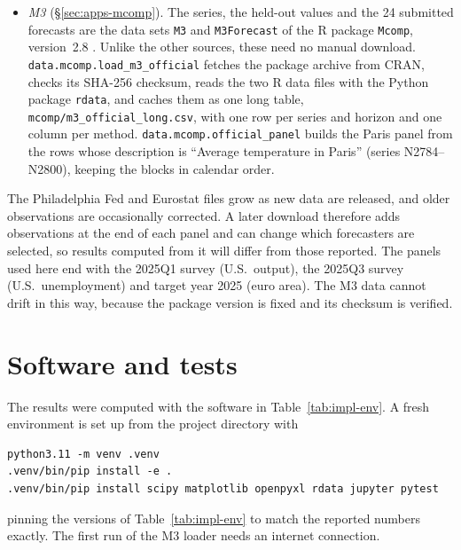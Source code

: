 \begin{appendix}
\begin{itemize}[leftmargin=*]
    \texttt{gjp/ifps.csv} and the individual forecasts of tournament years~1 and~2,
    \texttt{gjp/survey\_fcasts.yr1.csv} and \texttt{gjp/survey\_fcasts.yr2.csv}, come
    from the Harvard Dataverse release \citep{gjpdata2016}, licensed CC0.
    \texttt{data.gjp.brier\_panel} keeps closed questions with a resolved outcome,
    drops withdrawn forecasts and orders the questions by close date.
  \item \emph{M3} (\S\ref{sec:apps-mcomp}). The series, the held-out values and the
    24 submitted forecasts are the data sets \texttt{M3} and \texttt{M3Forecast} of
    the R package \texttt{Mcomp}, version~2.8 \citep{hyndman2018mcomp}. Unlike the
    other sources, these need no manual download.
    \texttt{data.mcomp.load\_m3\_official} fetches the package archive from CRAN,
    checks its SHA-256 checksum, reads the two R data files with the Python package
    \texttt{rdata}, and caches them as one long table,
    \texttt{mcomp/m3\_official\_long.csv}, with one row per series and horizon and
    one column per method. \texttt{data.mcomp.official\_panel} builds the Paris panel
    from the rows whose description is ``Average temperature in Paris'' (series
    N2784--N2800), keeping the blocks in calendar order.
\end{itemize}
The Philadelphia Fed and Eurostat files grow as new data are released, and older
observations are occasionally corrected. A later download therefore adds observations
at the end of each panel and can change which forecasters are selected, so results
computed from it will differ from those reported. The panels used here end
with the 2025Q1 survey (U.S.\ output), the 2025Q3 survey (U.S.\ unemployment) and
target year 2025 (euro area). The M3 data cannot drift in this way, because the
package version is fixed and its checksum is verified.

\section{Software and tests}
\label{app:impl-env}

The results were computed with the software in Table~\ref{tab:impl-env}. A fresh
environment is set up from the project directory with
\begin{verbatim}
python3.11 -m venv .venv
.venv/bin/pip install -e .
.venv/bin/pip install scipy matplotlib openpyxl rdata jupyter pytest
\end{verbatim}
pinning the versions of Table~\ref{tab:impl-env} to match the reported numbers
exactly. The first run of the M3 loader needs an internet connection.


\end{appendix}
